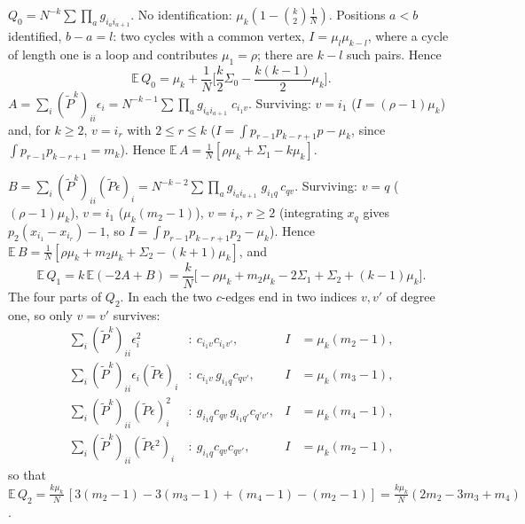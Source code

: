\documentclass[11pt,a4paper]{article}
\makeatletter
\theoremstyle{stmt}
\theoremstyle{defn}
\theoremstyle{rmk}
\renewenvironment{proof}[1][\proofname]{\par\pushQED{\qed}\normalfont\topsep6\p@\@plus6\p@\relax
  \trivlist\item[\hskip\labelsep{\sffamily\itshape\small #1.}]\ignorespaces}{\popQED\endtrivlist\@endpefalse}
\numberwithin{equation}{section}
\makeatother
\begin{document}
{\begin{proof}
\smallskip\noindent$Q_0=N^{-k}\sum\prod_ag_{i_ai_{a+1}}$. No identification: $\mu_k(1-\binom k2\frac1N)$. Positions $a<b$ identified, $b-a=l$: two cycles with a common vertex, $I=\mu_l\mu_{k-l}$, where a cycle of length one is a loop and contributes $\mu_1=\rho$; there are $k-l$ such pairs. Hence
\[
\mathbb E\,Q_0=\mu_k+\frac1N\Big[\frac k2\Sigma_0-\frac{k(k-1)}2\mu_k\Big].
\]
\noindent$A=\sum_i(\tilde P^k)_{ii}\epsilon_i=N^{-k-1}\sum\prod_ag_{i_ai_{a+1}}\;c_{i_1v}$. Surviving: $v=i_1$ ($I=(\rho-1)\mu_k$) and, for $k\ge2$, $v=i_r$ with $2\le r\le k$ ($I=\int p_{r-1}p_{k-r+1}p-\mu_k$, since $\int p_{r-1}p_{k-r+1}=m_k$). Hence $\mathbb E\,A=\frac1N[\rho\mu_k+\Sigma_1-k\mu_k]$.

\noindent$B=\sum_i(\tilde P^k)_{ii}(\tilde P\epsilon)_i=N^{-k-2}\sum\prod_ag_{i_ai_{a+1}}\;g_{i_1q}\,c_{qv}$. Surviving: $v=q$ ($(\rho-1)\mu_k$), $v=i_1$ ($\mu_k(m_2-1)$), $v=i_r$, $r\ge2$ (integrating $x_q$ gives $p_2(x_{i_1}-x_{i_r})-1$, so $I=\int p_{r-1}p_{k-r+1}p_2-\mu_k$). Hence $\mathbb E\,B=\frac1N[\rho\mu_k+m_2\mu_k+\Sigma_2-(k+1)\mu_k]$, and
\[
\mathbb E\,Q_1=k\,\mathbb E(-2A+B)=\frac kN\Big[-\rho\mu_k+m_2\mu_k-2\Sigma_1+\Sigma_2+(k-1)\mu_k\Big].
\]
\noindent The four parts of $Q_2$. In each the two $c$-edges end in two indices $v,v'$ of degree one, so only $v=v'$ survives:
\begin{align*}
\textstyle\sum_i(\tilde P^k)_{ii}\epsilon_i^2&:\ c_{i_1v}c_{i_1v'},&I&=\mu_k(m_2-1),\\
\textstyle\sum_i(\tilde P^k)_{ii}\epsilon_i(\tilde P\epsilon)_i&:\ c_{i_1v}\,g_{i_1q}c_{qv'},&I&=\mu_k(m_3-1),\\
\textstyle\sum_i(\tilde P^k)_{ii}(\tilde P\epsilon)_i^2&:\ g_{i_1q}c_{qv}\,g_{i_1q'}c_{q'v'},&I&=\mu_k(m_4-1),\\
\textstyle\sum_i(\tilde P^k)_{ii}(\tilde P\epsilon^2)_i&:\ g_{i_1q}c_{qv}c_{qv'},&I&=\mu_k(m_2-1),
\end{align*}
so that $\mathbb E\,Q_2=\frac{k\mu_k}N\,[3(m_2-1)-3(m_3-1)+(m_4-1)-(m_2-1)]=\frac{k\mu_k}N(2m_2-3m_3+m_4)$.


\end{proof}}
\end{document}
